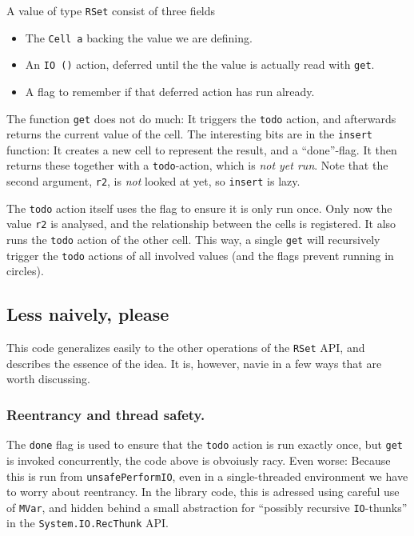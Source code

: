 \documentclass[manuscript,screen,acmsmall]{acmart}
\begin{document}
A value of type \verb|RSet| consist of three fields
\begin{itemize}
\item The \verb|Cell a| backing the value we are defining.
\item An \verb|IO ()| action, deferred until the the value is actually read with \verb|get|.
\item A flag to remember if that deferred action has run already.
\end{itemize}

The function \verb|get| does not do much: It triggers the \verb|todo| action, and afterwards returns the current value of the cell. The interesting bits are in the \verb|insert| function: It creates a new cell to represent the result, and a “done”-flag. It then returns these together with a \verb|todo|-action, which is \emph{not yet run}. Note that the second argument, \verb|r2|, is \emph{not} looked at yet, so \verb|insert| is lazy.

The \verb|todo| action itself uses the flag to ensure it is only run once. Only now the value \verb|r2| is analysed, and the relationship between the cells is registered. It also runs the \verb|todo| action of the other cell. This way, a single \verb|get| will recursively trigger the \verb|todo| actions of all involved values (and the flags prevent running in circles).

\subsection{Less naively, please}

This code generalizes easily to the other operations of the \verb|RSet| API, and describes the essence of the idea. It is, however, navie in a few ways that are worth discussing.

\subsubsection{Reentrancy and thread safety.}\label{sec:thread}

The \verb|done| flag is used to ensure that the \verb|todo| action is run exactly once, but \verb|get| is invoked concurrently, the code above is obvoiusly racy. Even worse: Because this is run from \verb|unsafePerformIO|, even in a single-threaded environment we have to worry about reentrancy. In the library code, this is adressed using careful use of \verb|MVar|, and hidden behind a small abstraction for “possibly recursive \verb|IO|-thunks” in the \verb|System.IO.RecThunk| API.
\end{document}
